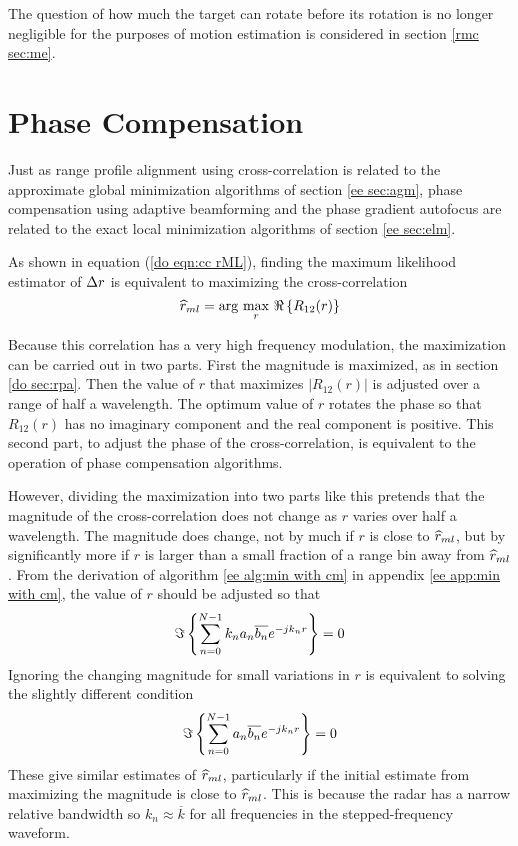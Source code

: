 The question of how much the target can rotate before its rotation is no
longer negligible for the purposes of motion estimation is considered in
section \ref{rmc sec:me}.

\section{Phase Compensation}
\label{do sec:pc}

Just as range profile alignment using cross-correlation is related to the
approximate global minimization algorithms of section \ref{ee sec:agm},
phase compensation using adaptive beamforming and the phase gradient
autofocus are related to the exact local minimization algorithms of section
\ref{ee sec:elm}.

As shown in equation (\ref{do eqn:cc rML}), finding the maximum likelihood
estimator of ${\Delta r}$ is equivalent to maximizing the cross-correlation 
\begin{equation}
\widehat{r}_{ml}=\arg\,\max_{{r}}\,\Re\left\{R_{12}(r)\right\}
\end{equation}

Because this correlation has a very high frequency modulation, the
maximization can be carried out in two parts.  First the magnitude is
maximized, as in section \ref{do sec:rpa}.  Then the value of $r$ that
maximizes $\left|R_{12}(r)\right|$ is adjusted over a range of half a
wavelength.  The optimum value of $r$ rotates the phase so that $R_{12}(r)$ 
has no imaginary component and the real component is positive.  This second
part, to adjust the phase of the cross-correlation, is equivalent to the
operation of phase compensation algorithms.

However, dividing the maximization into two parts like this pretends that
the magnitude of the cross-correlation does not change as $r$ varies over
half a wavelength.  The magnitude does change, not by much if $r$ is close
to $\widehat{r}_{ml}$, but by significantly more if $r$ is larger than a small fraction
of a range bin away from $\widehat{r}_{ml}$.  From the derivation of algorithm \ref{ee
alg:min with cm} in appendix \ref{ee app:min with cm}, the value of $r$
should be adjusted so that
\begin{equation}
\Im\left\{\sum_{n=0}^{N-1} k_na_n\overline{b_n}{e^{-jk_nr}}\right\}=0
\end{equation}
Ignoring the changing magnitude for small variations in $r$ is equivalent
to solving the slightly different condition
\begin{equation}\label{do eqn:condit}
\Im\left\{\sum_{n=0}^{N-1} a_n\overline{b_n}{e^{-jk_nr}}\right\}=0
\end{equation}
These give similar estimates of $\widehat{r}_{ml}$, particularly if the initial
estimate from maximizing the magnitude is close to $\widehat{r}_{ml}$.  This is because
the radar has a narrow relative bandwidth so $k_n\approx\overline{k}$ for
all frequencies in the stepped-frequency waveform.

